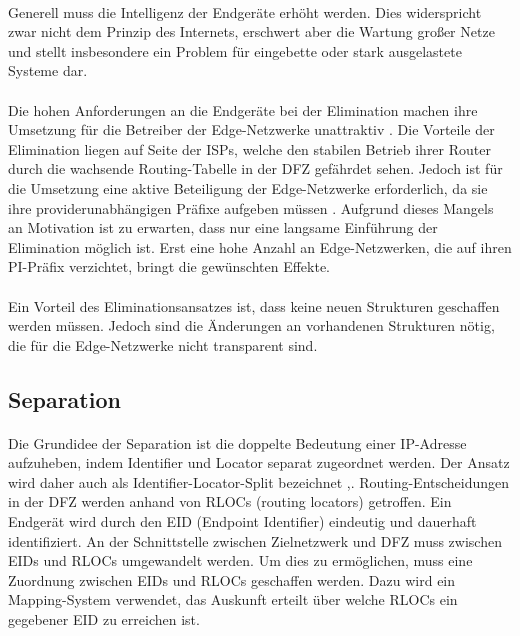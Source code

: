 \paragraph{}
Generell muss die Intelligenz der Endgeräte erhöht werden. Dies widerspricht zwar nicht dem Prinzip des Internets, erschwert aber die Wartung großer Netze und stellt insbesondere ein Problem für eingebette oder stark ausgelastete Systeme dar. 

\paragraph{}
Die hohen Anforderungen an die Endgeräte bei der Elimination machen ihre Umsetzung für die Betreiber der Edge-Netzwerke unattraktiv \cite{jen:2008:start}. Die Vorteile der Elimination liegen auf Seite der ISPs, welche den stabilen Betrieb ihrer Router durch die wachsende Routing-Tabelle in der DFZ ge\-fähr\-det sehen. Jedoch ist für die Umsetzung eine aktive Beteiligung der Edge-Netz\-wer\-ke erforderlich, da sie ihre providerunabhängigen Präfixe aufgeben müs\-sen \cite{jen:2008:start}. Aufgrund dieses Mangels an Motivation ist zu erwarten, dass nur eine langsame Einführung der Elimination möglich ist. Erst eine hohe Anzahl an Edge-Netzwerken, die auf ihren PI-Präfix verzichtet, bringt die gewünschten Effekte. 

\paragraph{}
Ein Vorteil des Eliminationsansatzes ist, dass keine neuen Strukturen geschaffen werden müssen. Jedoch sind die Änderungen an vorhandenen Strukturen nötig, die für die Edge-Netzwerke nicht transparent sind.

\subsection{Separation}
\paragraph{}
Die Grundidee der Separation ist die doppelte Bedeutung einer IP-Adresse aufzuheben, indem Identifier und Locator separat zugeordnet werden. Der Ansatz wird daher auch als Identifier-Locator-Split bezeichnet \cite{deering:1996:map},\cite{jen:2008:start}. Rout\-ing-Entscheidungen in der DFZ werden anhand von RLOCs (routing locators) getroffen. Ein Endgerät wird durch den EID (Endpoint Identifier) eindeutig und dauerhaft identifiziert. An der Schnittstelle zwischen Zielnetzwerk und DFZ muss zwischen EIDs und RLOCs umgewandelt werden. Um dies zu ermöglichen, muss eine Zuordnung zwischen EIDs und RLOCs geschaffen werden. Dazu wird ein Mapping-System verwendet, das Auskunft erteilt über welche RLOCs ein gegebener EID zu erreichen ist.

